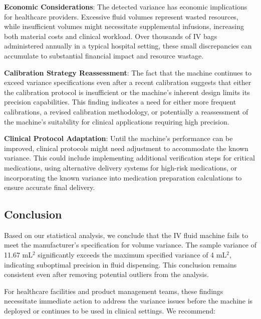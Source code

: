 \documentclass[12pt]{article}
\begin{document}
\textbf{Economic Considerations}: The detected variance has economic implications for healthcare providers. Excessive fluid volumes represent wasted resources, while insufficient volumes might necessitate supplemental infusions, increasing both material costs and clinical workload. Over thousands of IV bags administered annually in a typical hospital setting, these small discrepancies can accumulate to substantial financial impact and resource wastage.

\textbf{Calibration Strategy Reassessment}: The fact that the machine continues to exceed variance specifications even after a recent calibration suggests that either the calibration protocol is insufficient or the machine's inherent design limits its precision capabilities. This finding indicates a need for either more frequent calibrations, a revised calibration methodology, or potentially a reassessment of the machine's suitability for clinical applications requiring high precision.

\textbf{Clinical Protocol Adaptation}: Until the machine's performance can be improved, clinical protocols might need adjustment to accommodate the known variance. This could include implementing additional verification steps for critical medications, using alternative delivery systems for high-risk medications, or incorporating the known variance into medication preparation calculations to ensure accurate final delivery.

\subsection{Conclusion}
Based on our statistical analysis, we conclude that the IV fluid machine fails to meet the manufacturer's specification for volume variance. The sample variance of 11.67 mL$^2$ significantly exceeds the maximum specified variance of 4 mL$^2$, indicating suboptimal precision in fluid dispensing. This conclusion remains consistent even after removing potential outliers from the analysis.

For healthcare facilities and product management teams, these findings necessitate immediate action to address the variance issues before the machine is deployed or continues to be used in clinical settings. We recommend:
\end{document}
